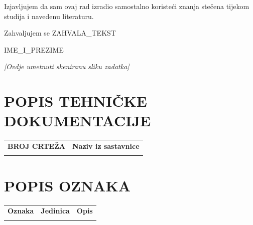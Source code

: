 \documentclass[12pt,a4paper]{article}
\begin{document}
\newpage
\thispagestyle{empty}
\vspace*{8cm}
\noindent Izjavljujem da sam ovaj rad izradio samostalno koristeći znanja stečena tijekom studija i navedenu literaturu.

\vspace{1cm}
\noindent Zahvaljujem se {{ZAHVALA_TEKST}}

\vspace{2cm}
\begin{flushright}
    {{IME_I_PREZIME}}
\end{flushright}

\newpage
\thispagestyle{empty}
\vspace*{\fill}
\begin{center}
    \textit{[Ovdje umetnuti skeniranu sliku zadatka]}
\end{center}
\vspace*{\fill}

\newpage
{}

\tableofcontents
\newpage
\listoffigures
\newpage
\listoftables
\newpage

\section*{POPIS TEHNIČKE DOKUMENTACIJE}
\begin{tabularx}{\textwidth}{>{\raggedright\arraybackslash}p{}X}
\textbf{BROJ CRTEŽA} & \textbf{Naziv iz sastavnice} \\
{{POPIS_TEHNICKE_DOKUMENTACIJE}} & \\
\end{tabularx}

\newpage
\section*{POPIS OZNAKA}
\begin{tabularx}{\textwidth}{>{\raggedright\arraybackslash}p{}>{\raggedright\arraybackslash}p{}X}
\textbf{Oznaka} & \textbf{Jedinica} & \textbf{Opis} \\
{{POPIS_OZNAKA}} & & \\
\end{tabularx}
\end{document}
